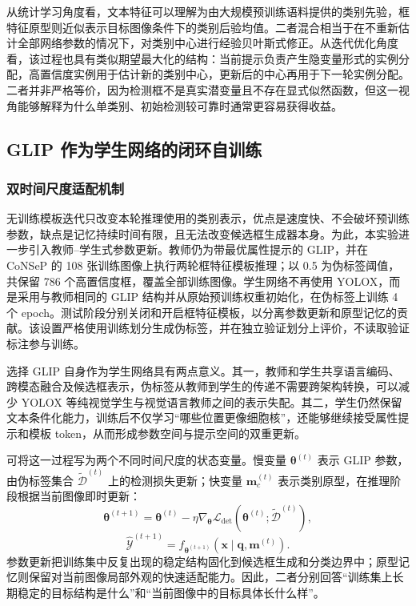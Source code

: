 从统计学习角度看，文本特征可以理解为由大规模预训练语料提供的类别先验，框特征原型则近似表示目标图像条件下的类别后验均值。二者混合相当于在不重新估计全部网络参数的情况下，对类别中心进行经验贝叶斯式修正。从迭代优化角度看，该过程也具有类似期望最大化的结构：当前提示负责产生隐变量形式的实例分配，高置信度实例用于估计新的类别中心，更新后的中心再用于下一轮实例分配。二者并非严格等价，因为检测框不是真实潜变量且不存在显式似然函数，但这一视角能够解释为什么单类别、初始检测较可靠时通常更容易获得收益。

\subsection{GLIP 作为学生网络的闭环自训练}

\subsubsection{双时间尺度适配机制}

无训练模板迭代只改变本轮推理使用的类别表示，优点是速度快、不会破坏预训练参数，缺点是记忆持续时间有限，且无法改变候选框生成器本身。为此，本实验进一步引入教师--学生式参数更新。教师仍为带最优属性提示的 GLIP，并在 CoNSeP 的 108 张训练图像上执行两轮框特征模板推理；以 0.5 为伪标签阈值，共保留 786 个高置信度框，覆盖全部训练图像。学生网络不再使用 YOLOX，而是采用与教师相同的 GLIP 结构并从原始预训练权重初始化，在伪标签上训练 4 个 epoch。测试阶段分别关闭和开启框特征模板，以分离参数更新和原型记忆的贡献。该设置严格使用训练划分生成伪标签，并在独立验证划分上评价，不读取验证标注参与训练。

选择 GLIP 自身作为学生网络具有两点意义。其一，教师和学生共享语言编码、跨模态融合及候选框表示，伪标签从教师到学生的传递不需要跨架构转换，可以减少 YOLOX 等纯视觉学生与视觉语言教师之间的表示失配。其二，学生仍然保留文本条件化能力，训练后不仅学习“哪些位置更像细胞核”，还能够继续接受属性提示和模板 token，从而形成参数空间与提示空间的双重更新。

可将这一过程写为两个不同时间尺度的状态变量。慢变量 $\boldsymbol\theta^{(t)}$ 表示 GLIP 参数，由伪标签集合 $\widetilde{\mathcal D}^{(t)}$ 上的检测损失更新；快变量 $\boldsymbol m_c^{(t)}$ 表示类别原型，在推理阶段根据当前图像即时更新：
\begin{equation}
\boldsymbol\theta^{(t+1)}
=\boldsymbol\theta^{(t)}
-\eta\nabla_{\boldsymbol\theta}
\mathcal L_{\mathrm{det}}
(\boldsymbol\theta^{(t)};\widetilde{\mathcal D}^{(t)}),
\end{equation}
\begin{equation}
\widehat{\mathcal Y}^{(t+1)}
=f_{\boldsymbol\theta^{(t+1)}}(
\boldsymbol x\mid\boldsymbol q,\boldsymbol m^{(t)}).
\end{equation}
参数更新把训练集中反复出现的稳定结构固化到候选框生成和分类边界中；原型记忆则保留对当前图像局部外观的快速适配能力。因此，二者分别回答“训练集上长期稳定的目标结构是什么”和“当前图像中的目标具体长什么样”。

